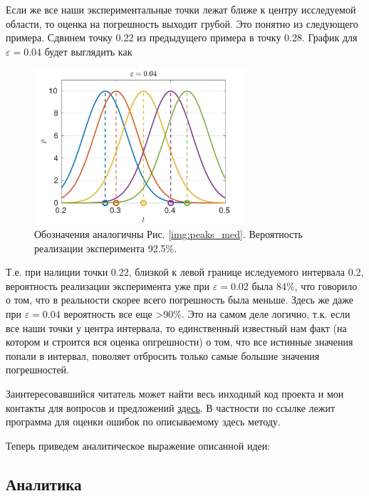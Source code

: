 \documentclass[a4paper,12pt]{article} %
\begin{document}
Если же все наши экспериментальные точки лежат ближе к центру исследуемой области, то оценка на погрешность выходит грубой. Это понятно из следующего примера. Сдвинем точку 0.22 из предыдущего примера в точку 0.28. График для $\varepsilon = 0.04$ будет выглядить как

\begin{figure}[h!]
\begin{center}
\includegraphics[width=0.7\textwidth]{./pics/peaks_smooth}
\end{center}
\caption{Обозначения аналогичны Рис. \ref{img:peaks_med}. Вероятность реализации эксперимента 92.5\%.} \label{img:peaks_smooth}
\end{figure}

Т.е. при налиции точки 0.22, близкой к левой границе иследуемого интервала 0.2, вероятность реализации эксперимента уже при $\varepsilon = 0.02$ была 84\%, что говорило о том, что в реальности скорее всего погрешность была меньше. Здесь же даже при $\varepsilon = 0.04$ вероятность все еще >90\%. Это на самом деле логично, т.к. если все наши точки у центра интервала, то единственный известный нам факт (на котором и строится вся оценка опгрешности) о том, что все истинные значения попали в интервал, поволяет отбросить только самые большие значения погрешностей.

Заинтересовавшийся читатель может найти весь инходный код проекта и мои контакты для вопросов и предложений \href{https://github.com/PolyachenkoYA/errorEstimationIOGT}{здесь}. В частности по ссылке лежит программа для оценки ошибок по описываемому здесь методу.

Теперь приведем аналитическое выражение описанной идеи:

\newpage

\subsection{Аналитика}
\end{document}
